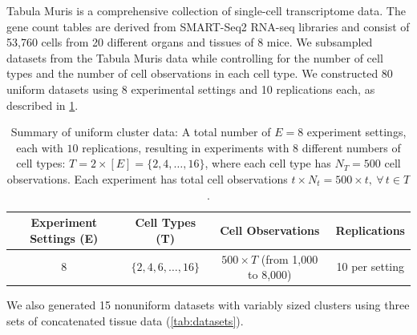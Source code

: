 Tabula Muris \citep{mice}
is a comprehensive collection of single-cell transcriptome data.
The gene count tables are derived from SMART-Seq2 RNA-seq libraries and consist
of 53,760 cells from 20 different organs and tissues of 8 mice. 
%
We subsampled datasets from the Tabula Muris data while controlling for the number of cell types and the number of cell observations in each cell type.
We constructed 80 \textsf{uniform} datasets using 8 experimental settings and 10 replications each, as
described in \cref{tab:subsampled-datasets}.
%
\begin{table}[tp]
	\centering
	\caption{Summary of uniform cluster data:
		A total number of $E=8$ experiment settings, each with $10$ replications, resulting in experiments with 8 different numbers of cell types: $T = 2\times[E]  =  \{2,4,…,16\}$, where each cell type has $ N_T = 500$ cell observations. Each experiment has total cell observations $t\times N_t=500\times t,\ \forall \, t\in T$.}{
		\begin{tabular}{cccc}
			\hline
			\textbf{Experiment Settings (E)} & \textbf{Cell Types (T)}   & \textbf{Cell Observations}           & \textbf{Replications} \\ \hline
			8                                & $\{2, 4, 6, \ldots, 16\}$ & $500 \times T$ (from 1,000 to 8,000) & 10 per setting        \\ \hline
		\end{tabular}}
	\label{tab:subsampled-datasets}
\end{table}
%
We also generated 15 \textsf{nonuniform} datasets with variably sized clusters using three sets of concatenated tissue data (\cref{tab:datasets}).
